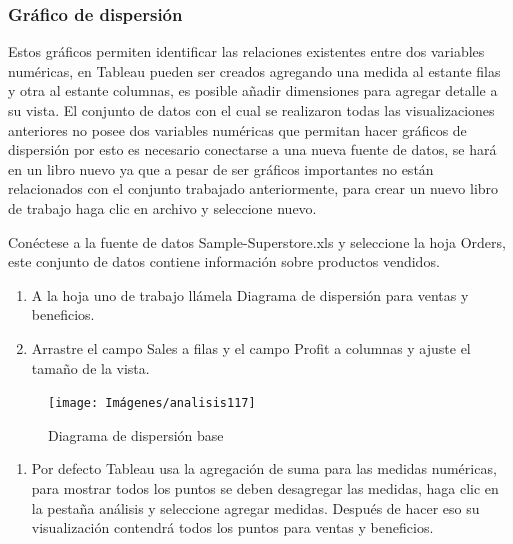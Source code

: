 \documentclass[
]{book}
\providecommand{\tightlist}{%
  \setlength{\itemsep}{0pt}\setlength{\parskip}{0pt}}
\begin{document}
\hypertarget{dispersion}{%
\subsubsection{Gráfico de dispersión}\label{dispersion}}

Estos gráficos permiten identificar las relaciones existentes entre dos variables numéricas, en Tableau pueden ser creados agregando una medida al estante filas y otra al estante columnas, es posible añadir dimensiones para agregar detalle a su vista. El conjunto de datos con el cual se realizaron todas las visualizaciones anteriores no posee dos variables numéricas que permitan hacer gráficos de dispersión por esto es necesario conectarse a una nueva fuente de datos, se hará en un libro nuevo ya que a pesar de ser gráficos importantes no están relacionados con el conjunto trabajado anteriormente, para crear un nuevo libro de trabajo haga clic en archivo y seleccione nuevo.

Conéctese a la fuente de datos Sample-Superstore.xls y seleccione la hoja Orders, este conjunto de datos contiene información sobre productos vendidos.

\begin{enumerate}
\def\labelenumi{\arabic{enumi}.}
\item
  A la hoja uno de trabajo llámela Diagrama de dispersión para ventas y beneficios.
\item
  Arrastre el campo Sales a filas y el campo Profit a columnas y ajuste el tamaño de la vista.
\end{enumerate}

\begin{figure}

{\centering \texttt{[image: Imágenes/analisis117]} 

}

\caption{Diagrama de dispersión base}\label{fig:paso2dispersion-fig}
\end{figure}

\begin{enumerate}
\def\labelenumi{\arabic{enumi}.}
\setcounter{enumi}{2}
\tightlist
\item
  Por defecto Tableau usa la agregación de suma para las medidas numéricas, para mostrar todos los puntos se deben desagregar las medidas, haga clic en la pestaña análisis y seleccione agregar medidas. Después de hacer eso su visualización contendrá todos los puntos para ventas y beneficios.
\end{enumerate}
\end{document}
